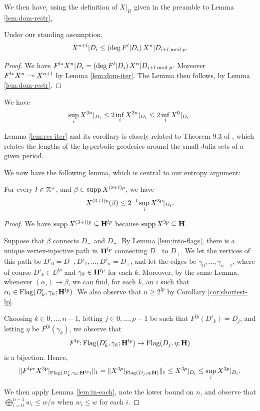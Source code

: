 We then have, using the definition of $X|_D$ given in the preamble to Lemma \ref{lem:dom-restr},
\begin{lemma} \label{lem:res-iter}
Under our standing assumption,
$$X^{n+l}|D_i \le (\deg F^l|D_i)\, X^{n}|D_{i+l \bmod p}.$$
\end{lemma}
\begin{proof}
We have $F^{l*}X^{n}|D_i = (\deg F^l|D_i)\, X^{n}|D_{i+l \bmod p}$.
Moreover $F^{l*}X^{n} \multimap X^{n+l}$ by Lemma \ref{lem:dom-iter}.
The Lemma then follows, by Lemma \ref{lem:dom-restr}.
\end{proof}
\begin{cor} \label{cor:sup-inf}
We have 
$$
\sup_i X^{3n}|_{D_i} \le 2 \inf_i X^{2n}|_{D_i} \le 2 \inf_i X^{0}|_{D_i}.
$$
\end{cor}
\begin{rem}
Lemma \ref{lem:res-iter} and its corollary is closely related to Theorem 9.3 of \cite{McM},
which relates the lengths of the hyperbolic geodesics around the small Julia sets of a given period. 
\end{rem}
We now have the following lemma, which is central to our entropy argument:
\begin{lemma} \label{lem:entropy-center}
For every $l \in {\Bbb Z}^+$, and $\beta \in \operatorname{supp} X^{(3+l) p}$,
we have
$$
X^{(3+l) p}(\beta) \le 2^{-l} \sup_i X^{3p}|_{D_i}.
$$
\end{lemma}
\begin{proof}
We have $\operatorname{supp} X^{(3+l)p} \subseteq {\mathbf{H}}^{lp}$ because $\operatorname{supp} X^{3p} \subseteq {\mathbf{H}}$.

Suppose that $\beta$ connects $D_-$ and $D_+$.
By Lemma \ref{lem:into-flags},
there is a unique vertex-injective path in ${\mathbf{H}}^{lp}$ connecting $D_-$ to $D_+$. 
We let the vertices of this path be $D'_0 = D_-, D'_1, \ldots, D'_n = D_+$,
and let the edges be $\gamma_0, \ldots, \gamma_{n-1}$,
where of course $D'_k \in \DD^{lp}$ and $\gamma_k \in {\mathbf{H}}^{lp}$ for each $k$.
Moreover, 
by the same Lemma,
whenever $(\alpha_i) \to \beta$,
we can find, for each $k$, an $i$ such that $\alpha_i \in \operatorname{Flag}(D'_k, \gamma_k; {\mathbf{H}}^{lp})$.
We also observe that $n \ge 2^{lp}$ by Corollary \ref{cor:shortest-lp}.

Choosing $k \in 0, \ldots, n-1$,
letting $j \in 0, \ldots, p-1$ be such that $F^{lp}(D'_k) = D_j$, and
letting $\eta$ be $F^{lp}(\gamma_k)$,
we observe that 
$$F^{lp}\mathpunct: \operatorname{Flag}(D'_k, \gamma_k; {\mathbf{H}}^{lp}) \to \operatorname{Flag}(D_j, \eta; {\mathbf{H}})$$
is a bijection.
Hence, 
$$
\Vert F^{lp*}X^{3p}|_{\operatorname{Flag}(D'_k, \gamma_k; {\mathbf{H}}^{lp})} \Vert_1 = \Vert X^{3p}|_{\operatorname{Flag}(D_j, \eta; {\mathbf{H}})} \Vert_1
\le {X^{3p}|_{D_i}} \le \sup_i {X^{3p}|_{D_i}}.
$$

We then apply Lemma \ref{lem:in-each},
note the lower bound on $n$, and observe that $\bigoplus_{i=0}^{n-1} w_i \le w/n$ when $w_i \le w$ for each $i$.
\end{proof}

